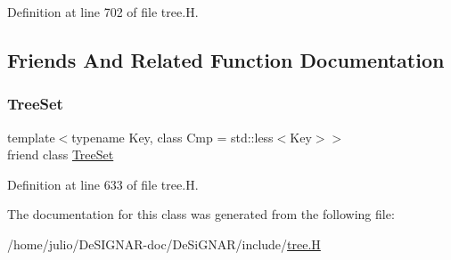 Definition at line 702 of file tree.\+H.



\subsection{Friends And Related Function Documentation}
\mbox{\label{class_designar_1_1_tree_set_1_1_inorder_iterator_a7caa42294700d2a60905ec3458a7cd8a}} 
\subsubsection{\texorpdfstring{Tree\+Set}{TreeSet}}
{\footnotesize\ttfamily template$<$typename Key, class Cmp = std\+::less$<$\+Key$>$$>$ \\
friend class \hyperlink{class_designar_1_1_tree_set}{Tree\+Set}\hspace{0.3cm}{\ttfamily [friend]}}



Definition at line 633 of file tree.\+H.



The documentation for this class was generated from the following file\+:\begin{DoxyCompactItemize}
\item 
/home/julio/\+De\+S\+I\+G\+N\+A\+R-\/doc/\+De\+Si\+G\+N\+A\+R/include/\hyperlink{tree_8_h}{tree.\+H}\end{DoxyCompactItemize}
